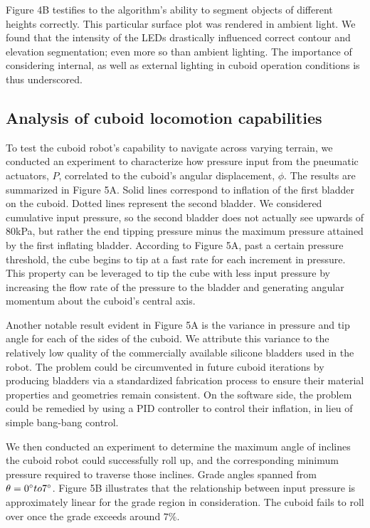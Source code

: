 \documentclass[letterpaper, 12 pt, conference]{ieeeconf}  %
\begin{document}
Figure 4B testifies to the algorithm's ability to segment objects of different heights correctly. This particular surface plot was rendered in ambient light. We found that the intensity of the LEDs drastically influenced correct contour and elevation segmentation; even more so than ambient lighting. The importance of considering internal, as well as external lighting in cuboid operation conditions is thus underscored. 

\subsection{Analysis of cuboid locomotion capabilities}

To test the cuboid robot's capability to navigate across varying terrain, we conducted an experiment to characterize how pressure input from the pneumatic actuators, $P$, correlated to the cuboid's angular displacement, $\phi$. The results are summarized in Figure 5A. Solid lines correspond to inflation of the first bladder on the cuboid. Dotted lines represent the second bladder. We considered cumulative input pressure, so the second bladder does not actually see upwards of 80kPa, but rather the end tipping pressure minus the maximum pressure attained by the first inflating bladder. According to Figure 5A, past a certain pressure threshold, the cube begins to tip at a fast rate for each increment in pressure. This property can be leveraged to tip the cube with less input pressure by increasing the flow rate of the pressure to the bladder and generating angular momentum about the cuboid's central axis. 

Another notable result evident in Figure 5A is the variance in pressure and tip angle for each of the sides of the cuboid. We attribute this variance to the relatively low quality of the commercially available silicone bladders used in the robot. The problem could be circumvented in future cuboid iterations by producing bladders via a standardized fabrication process to ensure their material properties and geometries remain consistent. On the software side, the problem could be remedied by using a PID controller to control their inflation, in lieu of simple bang-bang control. 

We then conducted an experiment to determine the maximum angle of inclines the cuboid robot could successfully roll up, and the corresponding minimum pressure required to traverse those inclines. Grade angles spanned from $\theta = 0\degree to 7\degree$. Figure 5B illustrates that the relationship between input pressure is approximately linear for the grade region in consideration. The cuboid fails to roll over once the grade exceeds around $7\percent$.  
\end{document}
